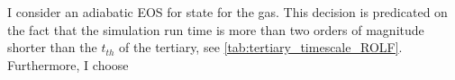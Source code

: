 I consider an adiabatic EOS for state for the gas. This decision is predicated on the fact that the simulation run time is more than two orders of magnitude shorter than the $t_{th}$ of the tertiary, see \cref{tab:tertiary_timescale_ROLF}. Furthermore, I choose 
